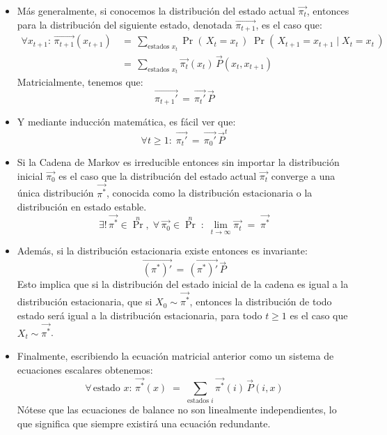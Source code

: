 \documentclass[ 10pt, xcolor = dvipsnames]{beamer}
\begin{document}
\begin{frame}[allowframebreaks]
\begin{itemize}
\item M\'as generalmente, si conocemos la distribuci\'on del estado actual $\vec{\pi_t}$, entonces para la distribuci\'on del siguiente estado, denotada $\vec{\pi_{t+1}}$, \linebreak es el caso que: 
\begin{align*}
\forall x_{t+1} \colon \, \vec{\pi_{t+1}}(x_{t+1}) \, 
& = \, \sum_{\text{estados } x_t} \Pr( \, X_t = x_t \, ) \; \Pr( \, X_{t+1} = x_{t+1} \mid X_t = x_t \, ) \\[1ex]
& = \, \sum_{\text{estados } x_t} \vec{\pi_t}(x_t) \, \vec{P}(x_t,x_{t+1})
\end{align*}
Matricialmente, tenemos que: 
\[
\vec{\pi_{t+1}'} \, = \, \vec{\pi_t'} \, \vec{P}
\]
\item Y mediante inducci\'on matem\'atica, es f\'acil ver que: 
\[
\forall t \geq 1 \colon \;
\vec{\pi_t'} \, = \, \vec{\pi_0'} \, \vec{P}^t
\]
\end{itemize}
\framebreak

\begin{itemize}
\item Si la Cadena de Markov es irreducible entonces sin importar la distribuci\'on inicial $\vec{\pi_0}$ es el caso que la distribuci\'on del estado actual $\vec{\pi_t}$ converge a una \'unica distribuci\'on $\vec{\pi^*}$, conocida como la distribuci\'on estacionaria o la distribuci\'on en estado estable. \Iec 
\[
\exists! \, \vec{\pi^*} \in \Pr^n, \; \forall \, \vec{\pi_0} \in \Pr^n \; \colon \;
\lim_{ t \rightarrow \infty } \vec{\pi_t} \; = \;
\vec{\pi^*}
\]
\item Adem\'as, si la distribuci\'on estacionaria existe entonces es invariante: 
\[
\vec{(\pi^*)'} \, = \, \vec{(\pi^*)'} \, \vec{P}
\]
Esto implica que si la distribuci\'on del estado inicial de la cadena es igual a \linebreak la distribuci\'on estacionaria, \ie que si $X_0 \sim \vec{\pi^*}$, entonces la distribuci\'on de todo estado ser\'a igual a la distribuci\'on estacionaria, \ie para todo $t \geq 1$ \linebreak es el caso que $X_t \sim \vec{\pi^*}$. 
\item Finalmente, escribiendo la ecuaci\'on matricial anterior como un sistema de ecuaciones escalares obtenemos: 
\[
\forall \, \text{estado } x \colon \, \vec{\pi^*}(x) \; = \; 
\sum_{\text{estados }i} \vec{\pi^*}(i) \, \vec{P}(i,x) 
\]
N\'otese que las ecuaciones de balance no son linealmente independientes, \linebreak lo que significa que siempre existir\'a una ecuaci\'on redundante. 
\end{itemize}

\end{frame}
\end{document}
